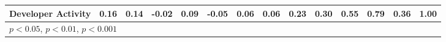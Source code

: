 \documentclass{article}
\begin{document}
{\begin{table}[htbp]
{\begin{tabular}{l*{13}{c}}
Developer Activity&        0.16\sym{***}&        0.14\sym{***}&       -0.02         &        0.09\sym{***}&       -0.05\sym{***}&        0.06\sym{***}&        0.06\sym{***}&        0.23\sym{***}&        0.30\sym{***}&        0.55\sym{***}&        0.79\sym{***}&        0.36\sym{***}&        1.00         \\
\hline\hline
\multicolumn{7}{l}{\footnotesize \sym{*} \(p<0.05\), \sym{**} \(p<0.01\), \sym{***} \(p<0.001\)}\\
\end{tabular}
}
\end{table}
}
\end{document}
